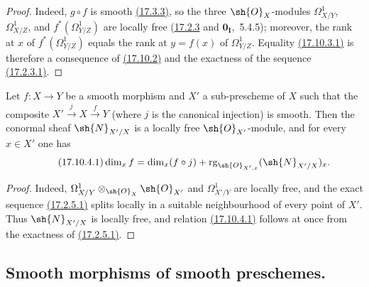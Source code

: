 \begin{proof}
Indeed, $g\circ f$ is smooth {\hyperlink{ega4.c04.prop.17-3-3}{(17.3.3)}}, so the three $\sh{O}_X$-modules $\Omega^1_{X/Y}$, $\Omega^1_{X/Z}$, and $f^*(\Omega^1_{Y/Z})$ are locally free ({\hyperlink{ega4.c04.prop.17-2-3}{17.2.3}} and $\mathbf{0}_\mathbf{I}$,~5.4.5); moreover, the rank at $x$ of $f^*(\Omega^1_{Y/Z})$ equals the rank at $y=f(x)$ of $\Omega^1_{Y/Z}$.
Equality {\hyperlink{ega4.c04.cor.17-10-3-1}{(17.10.3.1)}} is therefore a consequence of {\hyperlink{ega4.c04.prop.17-10-2}{(17.10.2)}} and the exactness of the sequence {\hyperlink{ega4.c04.eq.17-2-3-1}{(17.2.3.1)}}.
\end{proof}

\begin{corollary}[17.10.4]
\label{IV.17.10.4}
Let $f:X\to Y$ be a smooth morphism and $X'$ a sub-prescheme of $X$ such that the composite $X'\xrightarrow{j}X\xrightarrow{f}Y$ (where $j$ is the canonical injection) is smooth.
Then the conormal sheaf $\sh{N}_{X'/X}$ is a locally free $\sh{O}_{X'}$-module, and for every $x\in X'$ one has
\begin{equation}
\label{IV.17.10.4.1}
\tag{17.10.4.1}
  \dim_x f = \dim_x(f\circ j) + \operatorname{rg}_{\sh{O}_{X',x}}(\sh{N}_{X'/X})_x.
\end{equation}
\end{corollary}

\begin{proof}
Indeed, $\Omega^1_{X/Y}\otimes_{\sh{O}_X}\sh{O}_{X'}$ and $\Omega^1_{X'/Y}$ are locally free, and the exact sequence {\hyperlink{ega4.c04.prop.17-2-5-1}{(17.2.5.1)}} splits locally in a suitable neighbourhood of every point of $X'$.
Thus $\sh{N}_{X'/X}$ is locally free, and relation {\hyperlink{ega4.c04.eq.17-10-4-1}{(17.10.4.1)}} follows at once from the exactness of {\hyperlink{ega4.c04.prop.17-2-5-1}{(17.2.5.1)}}.
\end{proof}


\subsection{Smooth morphisms of smooth preschemes.}
\label{subsection:IV.17.11}

